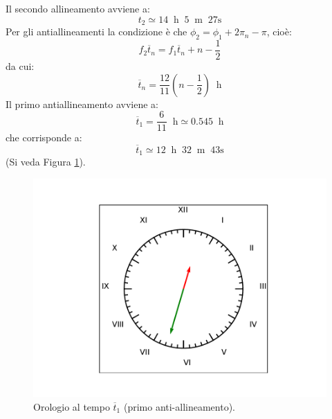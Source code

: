 \documentclass[12pt,a4paper]{book}
\begin{document}
Il secondo allineamento avviene a: 
\begin{equation*}
t_2\simeq 14 \; \; \text{h}  \; \; 5 \; \; \text{m} \; \; 27 \text{s}
\end{equation*}
Per gli antiallineamenti la condizione è che $\phi_2=\phi_1+ 2\pi_n - \pi$, cioè:
\begin{equation*}
f_2 \overline{t}_n=f_1 \overline{t}_n+  n - \frac{1}{2}
\end{equation*}
da cui:
\begin{equation*}
\overline{t}_n=\frac{12}{11} (n - \frac{1}{2})\; \; \text{h}
\end{equation*}
Il primo antiallineamento avviene a: 
\begin{equation*}
\overline{t}_1=\frac{6}{11} \; \; \text{h} \simeq 0.545 \; \; \text{h}  
\end{equation*}
che corrisponde a:
\begin{equation*}
\overline{t}_1\simeq 12 \; \; \text{h}  \; \; 32 \; \; \text{m} \; \; 43 \text{s}
\end{equation*}
(Si veda Figura \ref{fig:orologio3}). 

 \begin{figure}[!ht]
 \centering
\includegraphics[scale=0.55]{orologio3.pdf}
\caption{Orologio al tempo $\overline{t}_1$ (primo anti-allineamento). \label{fig:orologio3} }
\end{figure}
\end{document}
